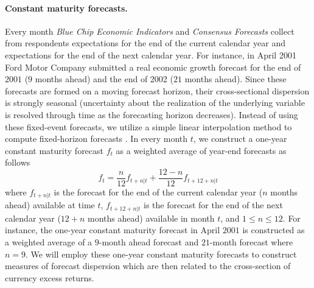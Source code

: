 \paragraph{Constant maturity forecasts.}
Every month \emph{Blue Chip Economic Indicators} and \emph{Consensus Forecasts} collect from respondents expectations for the end of the current calendar year and expectations for the end of the next calendar year. For instance, in April 2001 Ford Motor Company submitted a real economic growth forecast for the end of $2001$ ($9$ months ahead) and the end of 2002 ($21$ months ahead). Since these forecasts are formed on a moving forecast horizon, their cross-sectional dispersion is strongly seasonal (uncertainty about the realization of the underlying variable is resolved through time as the forecasting horizon decreases). Instead of using these fixed-event forecasts, we utilize a simple linear interpolation method to compute fixed-horizon forecasts \citep[e.g.,][]{DFS_2012,buraschi_whelan2012}. In every month $t$, we construct a one-year constant maturity forecast $f_{t}$ as a weighted average of year-end forecasts as follows
\begin{equation} \label{eq:fcst1y}
f_{t} = \frac{n}{12} f_{t+n|t} +  \frac{12-n}{12} f_{t+12+n|t}
\end{equation}
where  $f_{t+n|t}$ is the forecast for the end of the current calendar year ($n$ months ahead) available at time $t$, $f_{t+12+n|t}$ is the forecast for the end of the next calendar year ($12+n$ months  ahead) available in month $t$, and $1\leq n\leq 12$. For instance, the one-year constant maturity forecast in April $2001$ is constructed as a weighted average of a $9$-month ahead forecast and $21$-month forecast where $n=9$. We will employ these one-year constant maturity forecasts to construct measures of forecast dispersion which are then related to the cross-section of currency excess returns.



